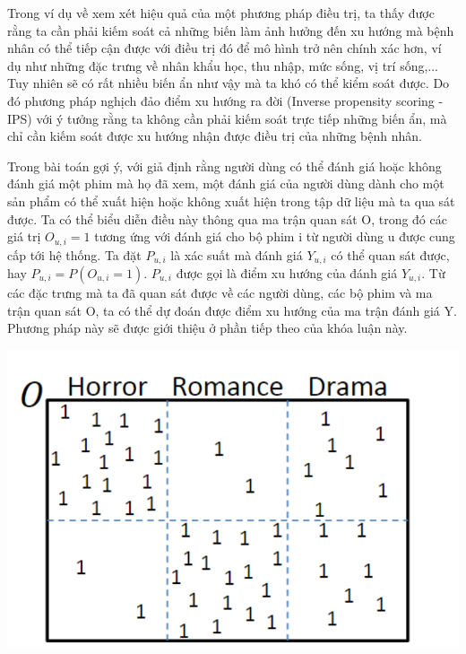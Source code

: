 Trong ví dụ về xem xét hiệu quả của một phương pháp điều trị, ta thấy được rằng ta cần phải kiếm soát cả những biến làm ảnh hưởng đến xu hướng mà bệnh nhân có thể tiếp cận được với điều trị đó để mô hình trở nên chính xác hơn, ví dụ như những đặc trưng về nhân khẩu học, thu nhập, mức sống, vị trí sống,... Tuy nhiên sẽ có rất nhiều biến ẩn như vậy mà ta khó có thể kiểm soát  được. Do đó phương pháp nghịch đảo điểm xu hướng ra đời (Inverse propensity scoring - IPS) với ý tưởng rằng ta không cần phải kiếm soát trực tiếp những biến ẩn, mà chỉ cần kiếm soát được xu hướng nhận được điều trị của những bệnh nhân. 

Trong bài toán gợi ý, với giả định rằng người dùng có thể đánh giá hoặc không đánh giá một phim mà họ đã xem, một đánh giá của người dùng dành cho một sản phẩm có thể xuất hiện hoặc không xuất hiện trong tập dữ liệu mà ta qua sát được. Ta có thể biểu diễn điều này thông qua ma trận quan sát O, trong đó các giá trị $O_{u,i}=1$ tương ứng với đánh giá cho bộ phim i từ người dùng u được cung cấp tới hệ thống. Ta đặt $P_{u,i}$ là xác suất mà đánh giá $Y_{u,i}$ có thể quan sát được, hay  $P_{u,i} = P(O_{u,i} = 1)$.  $P_{u,i}$ được gọi là điểm xu hướng của đánh giá  $Y_{u,i}$. Từ các đặc trưng mà ta đã quan sát được về các người dùng, các bộ phim và ma trận quan sát O, ta có thể dự đoán được điểm xu hướng của ma trận đánh giá Y. Phương pháp này sẽ được giới thiệu ở phần tiếp theo của khóa luận này.


\includegraphics[width=\textwidth]{images/Chapter3/O.png}


